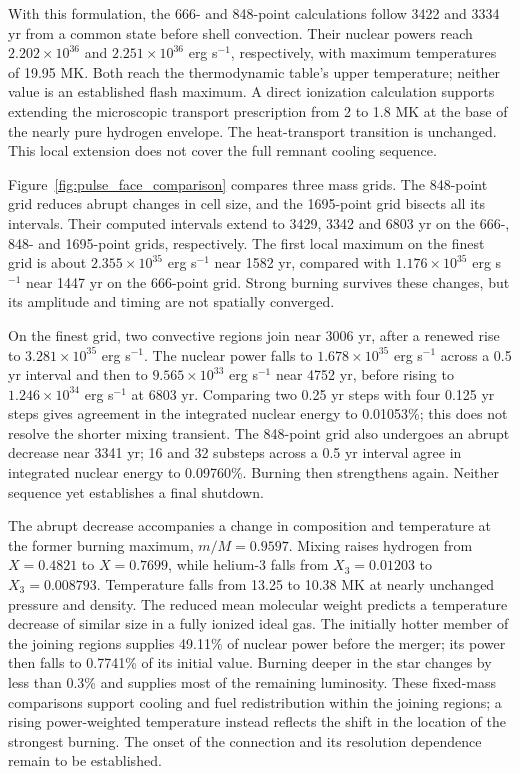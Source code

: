 \documentclass[11pt,letterpaper]{article}
\begin{document}
With this formulation, the 666- and 848-point calculations follow
3422 and 3334 yr from a common state before shell convection. Their
nuclear powers reach $2.202\times10^{36}$ and $2.251\times10^{36}$ erg s$^{-1}$,
respectively, with maximum temperatures of 19.95 MK. Both reach the
thermodynamic table's upper temperature; neither value is an established
flash maximum. A direct ionization calculation supports extending the
microscopic transport prescription from 2 to 1.8 MK at the base of the
nearly pure hydrogen envelope. The heat-transport transition is unchanged.
This local extension does not cover the full remnant cooling sequence.

Figure~\ref{fig:pulse_face_comparison} compares three mass grids. The
848-point grid reduces abrupt changes in cell size, and the 1695-point grid
bisects all its intervals. Their computed intervals extend to 3429, 3342
and 6803 yr on the 666-, 848- and 1695-point grids, respectively.
The first local maximum on the finest grid is about
$2.355\times10^{35}$ erg s$^{-1}$ near 1582 yr, compared with
$1.176\times10^{35}$ erg s$^{-1}$ near 1447 yr on the 666-point grid.
Strong burning survives these changes, but its amplitude and timing
are not spatially converged.

On the finest grid, two convective regions join near 3006 yr, after a
renewed rise to $3.281\times10^{35}$ erg s$^{-1}$. The nuclear power falls
to $1.678\times10^{35}$ erg s$^{-1}$ across a 0.5 yr interval and then to
$9.565\times10^{33}$ erg s$^{-1}$ near 4752 yr, before rising to
$1.246\times10^{34}$ erg s$^{-1}$ at 6803 yr. Comparing two
0.25 yr steps with four 0.125 yr steps gives agreement in the integrated
nuclear energy to 0.01053\%; this does not resolve the shorter mixing
transient. The 848-point grid also undergoes an abrupt decrease near
3341 yr; 16 and 32 substeps across a 0.5 yr interval agree in integrated
nuclear energy to 0.09760\%. Burning then strengthens again. Neither
sequence yet establishes a final shutdown.

The abrupt decrease accompanies a change in composition and temperature
at the former burning maximum, $m/M=0.9597$. Mixing raises hydrogen from
$X=0.4821$ to $X=0.7699$, while helium-3 falls from $X_3=0.01203$ to
$X_3=0.008793$. Temperature falls from 13.25 to 10.38 MK at nearly
unchanged pressure and density. The reduced mean molecular weight predicts
a temperature decrease of similar size in a fully ionized ideal gas.
The initially hotter member of the joining regions supplies 49.11\% of
nuclear power before the merger; its power then falls to 0.7741\% of its
initial value. Burning deeper in the star changes by less than 0.3\%
and supplies most of the remaining luminosity. These fixed-mass comparisons
support cooling and fuel redistribution within the joining regions;
a rising power-weighted temperature instead reflects the shift in the
location of the strongest burning. The onset of the connection and its
resolution dependence remain to be established.
\end{document}
